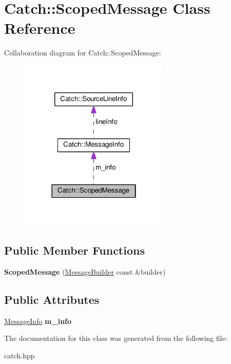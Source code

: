 \hypertarget{classCatch_1_1ScopedMessage}{}\section{Catch\+:\+:Scoped\+Message Class Reference}
\label{classCatch_1_1ScopedMessage}


Collaboration diagram for Catch\+:\+:Scoped\+Message\+:\nopagebreak
\begin{figure}[H]
\begin{center}
\leavevmode
\includegraphics[width=202pt]{classCatch_1_1ScopedMessage__coll__graph}
\end{center}
\end{figure}
\subsection*{Public Member Functions}
\begin{DoxyCompactItemize}
\item 
{\bfseries Scoped\+Message} (\hyperlink{structCatch_1_1MessageBuilder}{Message\+Builder} const \&builder)\hypertarget{classCatch_1_1ScopedMessage_a5cc59f0f2ebe840e6607f83004d49a17}{}\label{classCatch_1_1ScopedMessage_a5cc59f0f2ebe840e6607f83004d49a17}

\end{DoxyCompactItemize}
\subsection*{Public Attributes}
\begin{DoxyCompactItemize}
\item 
\hyperlink{structCatch_1_1MessageInfo}{Message\+Info} {\bfseries m\+\_\+info}\hypertarget{classCatch_1_1ScopedMessage_ae6e1476f389cc6e1586f033b3747b27b}{}\label{classCatch_1_1ScopedMessage_ae6e1476f389cc6e1586f033b3747b27b}

\end{DoxyCompactItemize}


The documentation for this class was generated from the following file\+:\begin{DoxyCompactItemize}
\item 
catch.\+hpp\end{DoxyCompactItemize}

